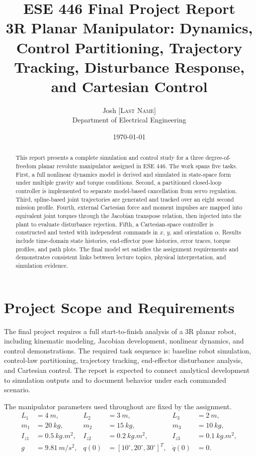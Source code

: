 \documentclass[11pt]{article}
\title{ESE 446 Final Project Report\\3R Planar Manipulator: Dynamics, Control Partitioning, Trajectory Tracking, Disturbance Response, and Cartesian Control}
\author{Josh \textsc{[Last Name]}\\Department of Electrical Engineering}
\date{\today}
\begin{document}
\maketitle

\begin{abstract}
This report presents a complete simulation and control study for a three degree-of-freedom planar revolute manipulator assigned in ESE 446. The work spans five tasks. First, a full nonlinear dynamics model is derived and simulated in state-space form under multiple gravity and torque conditions. Second, a partitioned closed-loop controller is implemented to separate model-based cancellation from servo regulation. Third, spline-based joint trajectories are generated and tracked over an eight second mission profile. Fourth, external Cartesian force and moment impulses are mapped into equivalent joint torques through the Jacobian transpose relation, then injected into the plant to evaluate disturbance rejection. Fifth, a Cartesian-space controller is constructed and tested with independent commands in $x$, $y$, and orientation $\alpha$. Results include time-domain state histories, end-effector pose histories, error traces, torque profiles, and path plots. The final model set satisfies the assignment requirements and demonstrates consistent links between lecture topics, physical interpretation, and simulation evidence.
\end{abstract}

\section{Project Scope and Requirements}
The final project requires a full start-to-finish analysis of a 3R planar robot, including kinematic modeling, Jacobian development, nonlinear dynamics, and control demonstrations. The required task sequence is: baseline robot simulation, control-law partitioning, trajectory tracking, end-effector disturbance analysis, and Cartesian control. The report is expected to connect analytical development to simulation outputs and to document behavior under each commanded scenario.

The manipulator parameters used throughout are fixed by the assignment.
\begin{align*}
L_1 &= \SI{4}{m}, & L_2 &= \SI{3}{m}, & L_3 &= \SI{2}{m},\\
m_1 &= \SI{20}{kg}, & m_2 &= \SI{15}{kg}, & m_3 &= \SI{10}{kg},\\
I_{z1} &= \SI{0.5}{kg.m^2}, & I_{z2} &= \SI{0.2}{kg.m^2}, & I_{z3} &= \SI{0.1}{kg.m^2},\\
g &= \SI{9.81}{m/s^2}, & q(0) &= [10^\circ,20^\circ,30^\circ]^T, & \dot q(0) &= 0.
\end{align*}
\end{document}
